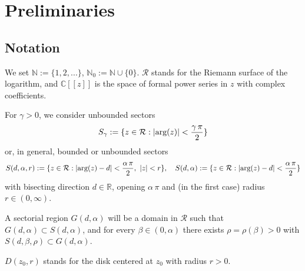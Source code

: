 \documentclass[11pt,a4paper,leqno]{article}
\theoremstyle{plain}
\theoremstyle{definition}
\def\C{\mathbb{C}}
\def\N{\mathbb{N}}
\def\R{\mathbb{R}}
\def\a{\alpha}
\begin{document}
\section{Preliminaries}
\subsection{Notation}\label{notation}
We set $\N:=\{1,2,...\}$, $\N_{0}:=\N\cup\{0\}$.
$\mathcal{R}$ stands for the Riemann surface of the logarithm, and
$\C[[z]]$ is the space of formal power series in $z$ with complex coefficients.\par\noindent
For $\gamma>0$, we consider unbounded sectors
$$S_{\gamma}:=\{z\in\mathcal{R}:|\hbox{arg}(z)|<\frac{\gamma\,\pi}{2}\}$$
or, in general, bounded or unbounded sectors
$$S(d,\alpha,r):=\{z\in\mathcal{R}:|\hbox{arg}(z)-d|<\frac{\alpha\,\pi}{2},\ |z|<r\},\quad
S(d,\alpha):=\{z\in\mathcal{R}:|\hbox{arg}(z)-d|<\frac{\alpha\,\pi}{2}\}$$
with bisecting direction $d\in\R$, opening $\alpha\,\pi$ and (in the first case) radius $r\in(0,\infty)$.\par\noindent
A sectorial region $G(d,\a)$ will be a domain in $\mathcal{R}$ such that $G(d,\a)\subset S(d,\a)$, and
for every $\beta\in(0,\a)$ there exists $\rho=\rho(\beta)>0$ with $S(d,\beta,\rho)\subset G(d,\a)$.\par\noindent
$D(z_0,r)$ stands for the disk centered at $z_0$ with radius $r>0$.
\end{document}
